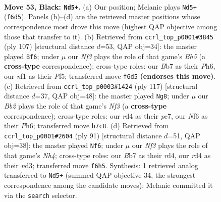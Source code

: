 \documentclass[11pt]{article}
\begin{document}
\clearpage

\begin{figure}[p]\centering
\begin{subfigure}{0.46\textwidth}\centering
\resizebox{\linewidth}{!}{%
\newchessgame
\chessboard[
  setfen={8/qb3pk1/5np1/8/3R3P/4K3/4R2P/5N2 b - - 14 53},
  showmover=false,
  pgfstyle=straightmove, color=movearrow, markmove={f6-d5}
]}
\caption{}
\end{subfigure}\hfill
\begin{subfigure}{0.46\textwidth}\centering
\resizebox{\linewidth}{!}{%
\newchessgame
\chessboard[
  setfen={8/6pk/q6p/5p2/7b/5P1P/1R2RP2/5KN1 b - - 12 54},
  showmover=false,
  pgfstyle=straightmove, color=movearrow, markmove={h4-f6}
]}
\caption{}
\end{subfigure}
\\[4pt]
\begin{subfigure}{0.46\textwidth}\centering
\resizebox{\linewidth}{!}{%
\newchessgame
\chessboard[
  setfen={8/2P3pk/5n1p/4q3/8/5P2/PR6/K1R5 b - - 2 59},
  showmover=false,
  pgfstyle=straightmove, color=movearrow, markmove={f6-g8}
]}
\caption{}
\end{subfigure}\hfill
\begin{subfigure}{0.46\textwidth}\centering
\resizebox{\linewidth}{!}{%
\newchessgame
\chessboard[
  setfen={8/6pk/7p/7n/3R3P/3N1K2/5P2/3r4 b - - 4 46},
  showmover=false,
  pgfstyle=straightmove, color=movearrow, markmove={h5-f6}
]}
\caption{}
\end{subfigure}
\caption{\textbf{Move 53, Black: \texttt{Nd5+}.} (a) Our position; Melanie plays \texttt{Nd5+} (\texttt{f6d5}). Panels (b)--(d) are the retrieved master positions whose correspondence most drove this move (highest QAP objective among those that transfer to it). (b) Retrieved from \texttt{ccrl\_top\_p0001\#3845} (ply 107) [structural distance $d$=53, QAP obj=34]: the master played \texttt{Bf6}; under $\mu$ our \emph{Nf3} plays the role of that game's \emph{Bh5} (a \textbf{cross-type} correspondence); cross-type roles: our \emph{B}b7 as their \emph{P}h6, our \emph{n}f1 as their \emph{P}f5; transferred move \texttt{f6d5} \textbf{(endorses this move)}. (c) Retrieved from \texttt{ccrl\_top\_p0003\#1424} (ply 117) [structural distance $d$=37, QAP obj=48]: the master played \texttt{Ng8}; under $\mu$ our \emph{Bb2} plays the role of that game's \emph{Nf3} (a \textbf{cross-type} correspondence); cross-type roles: our \emph{r}d4 as their \emph{p}c7, our \emph{N}f6 as their \emph{P}h6; transferred move \texttt{b7c8}. (d) Retrieved from \texttt{ccrl\_top\_p0001\#2604} (ply 91) [structural distance $d$=51, QAP obj=38]: the master played \texttt{Nf6}; under $\mu$ our \emph{Nf3} plays the role of that game's \emph{Nh4}; cross-type roles: our \emph{B}b7 as their \emph{r}d4, our \emph{r}d4 as their \emph{n}d3; transferred move \texttt{f6h5}. Synthesis: 1 retrieved analog transferred to \texttt{Nd5+} (summed QAP objective 34, the strongest correspondence among the candidate moves); Melanie committed it via the \texttt{search} selector.}
\label{fig:thought-m105}
\end{figure}
\end{document}
